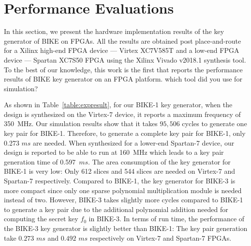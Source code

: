 \documentclass[runningheads]{llncs}
\begin{document}
\section{Performance Evaluations}
\label{sec::evaluation}
%
In this section, we present the hardware implementation results of the 
key generator of BIKE on FPGAs. 
All the results are obtained post place-and-route for a 
Xilinx high-end FPGA device --- Virtex XC7V585T 
and a low-end FPGA device --- Spartan XC7S50 FPGA 
using the Xilinx Vivado v2018.1 synthesis tool.
To the best of our knowledge, this work is the first 
that reports the performance results of BIKE key generator 
on an FPGA platform. 
{\color{red} which tool did you use for simulation?}

As shown in Table~\ref{table:expresult}, 
for our BIKE-1 key generator,
when the design is synthesized on the Virtex-7 device, 
it reports a maximum frequency of 350~MHz. 
Our simulation results show that it takes $95,506$ cycles 
to generate one key pair for BIKE-1.
Therefore, to generate a complete key pair for BIKE-1,
only 0.273 $ms$ are needed. 
When synthesized for a lower-end Spartan-7 device,
our design is reported to be able to run at 160~MHz 
which leads to a key pair generation time of 0.597~$ms$. 
The area consumption of the key generator
for BIKE-1 is very low: Only 612 slices and 544 slices 
are needed on Virtex-7 and Spartan-7 respectively. 
Compared to BIKE-1, the key generator for BIKE-3
is more compact since only one sparse polynomial
multiplication module is needed instead of two.
However, BIKE-3 takes slightly more cycles 
compared to BIKE-1 to generate a key pair
due to the additional polynomial addition 
needed for computing the secret key $f_0$ 
in BIKE-3.
In terms of run time,
the performance of the BIKE-3 key generator 
is slightly better than BIKE-1: 
The key pair generation take $0.273$ $ms$ and $0.492$ $ms$ 
respectively on Virtex-7 and Spartan-7 FPGAs. 
\end{document}

